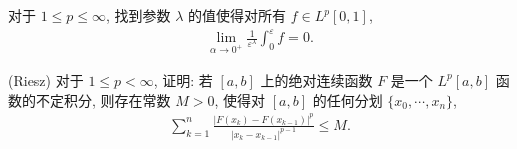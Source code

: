 \documentclass[../../main.tex]{subfiles}
\begin{document}
\begin{exercise}\label{exercise:ch07-21}
对于 $1\leqslant p\leqslant\infty$, 找到参数 $\lambda$ 的值使得对所有 $f\in L^{p}[0,1]$,
\begin{align*}
\lim_{\alpha\to 0^{+}}\frac{1}{\varepsilon^{\lambda}}\int_{0}^{\varepsilon}f=0.
\end{align*}
\end{exercise}

\begin{exercise}\label{exercise:ch07-22}
(Riesz) 对于 $1\leqslant p<\infty$, 证明: 若 $[a,b]$ 上的绝对连续函数 $F$ 是一个 $L^{p}[a,b]$ 函数的不定积分, 则存在常数 $M>0$, 使得对 $[a,b]$ 的任何分划 $\{x_{0},\cdots,x_{n}\}$,
\begin{align*}
\sum_{k=1}^{n}\frac{|F(x_{k})-F(x_{k-1})|^{p}}{|x_{k}-x_{k-1}|^{p-1}}\leqslant M.
\end{align*}
\end{exercise}
\end{document}
